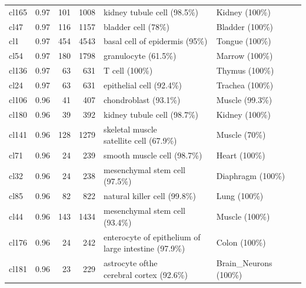 \begin{table}[ht!]
\begin{tabular}{lrrrll}
  cl165 & 0.97 & 101 & 1008 & kidney tubule cell (98.5\%) & Kidney (100\%) \\ 
  cl47 & 0.97 & 116 & 1157 & bladder cell (78\%) & Bladder (100\%) \\ 
  cl1 & 0.97 & 454 & 4543 & basal cell of epidermis (95\%) & Tongue (100\%) \\ 
  cl54 & 0.97 & 180 & 1798 & granulocyte (61.5\%) & Marrow (100\%) \\ 
  cl136 & 0.97 &  63 & 631 & T cell (100\%) & Thymus (100\%) \\ 
  cl24 & 0.97 &  63 & 631 & epithelial cell (92.4\%) & Trachea (100\%) \\ 
  cl106 & 0.96 &  41 & 407 & chondroblast (93.1\%) & Muscle (99.3\%) \\ 
  cl180 & 0.96 &  39 & 392 & kidney tubule cell (98.7\%) & Kidney (100\%) \\ 
  cl141 & 0.96 & 128 & 1279 & \specialcell[t]{skeletal muscle\\satellite cell (67.9\%)} & Muscle (70\%) \\ 
  cl71 & 0.96 &  24 & 239 & smooth muscle cell (98.7\%) & Heart (100\%) \\ 
  cl32 & 0.96 &  24 & 238 & mesenchymal stem cell (97.5\%) & Diaphragm (100\%) \\ 
  cl85 & 0.96 &  82 & 822 & natural killer cell (99.8\%) & Lung (100\%) \\ 
  cl44 & 0.96 & 143 & 1434 & mesenchymal stem cell (93.4\%) & Muscle (100\%) \\ 
  cl176 & 0.96 &  24 & 242 & \specialcell[t]{enterocyte of epithelium of\\large intestine (97.9\%)} & Colon (100\%) \\ 
  cl181 & 0.96 &  23 & 229 & \specialcell[t]{astrocyte ofthe\\cerebral cortex (92.6\%)} & Brain\_Neurons (100\%) \\ 
   \bottomrule
\end{tabular}
\end{table}

